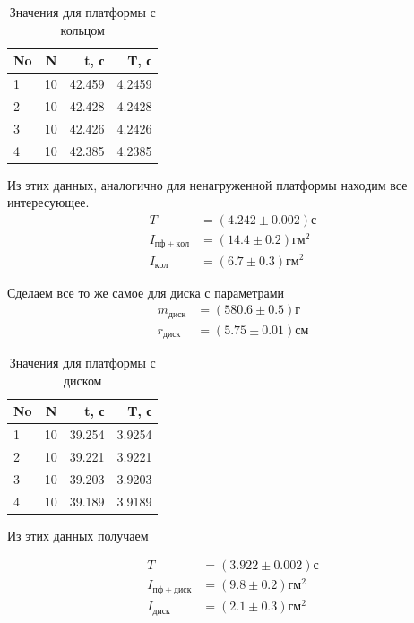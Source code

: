 \documentclass[a4paper, 12pt]{article}
\begin{document}
    \begin{table}[h!]
    \begin{center}
    \begin{tabular}{|l|r|r|r|}
    \hline
    No &   N &       t, с &         T, с \\
    \hline
    1  &  10 &  42.459 &  4.2459 \\
    2  &  10 &  42.428 &  4.2428 \\
    3  &  10 &  42.426 &  4.2426 \\
    4  &  10 &  42.385 &  4.2385 \\
    \hline
    \end{tabular}
    \end{center}
    \caption{Значения для платформы с кольцом}

    \end{table}
    Из этих данных, аналогично для ненагруженной платформы находим все интересующее.
    \begin{align*}
    T &= (4.242 \pm 0.002)с \\
    I_{пф+кол}&=(14.4 \pm 0.2)гм^2 \\
    I_{кол}&=(6.7 \pm 0.3)гм^2
    \end{align*}


    Сделаем все то же самое для диска с параметрами
    \begin{align*}
    m_{диск} &= (580.6 \pm 0.5) г \\
    r_{диск} &= (5.75 \pm 0.01) см
    \end{align*}

    \begin{table}[h!]
    \begin{center}
    \begin{tabular}{|l|r|r|r|}
    \hline
    No &   N &       t, с &         T, с \\
    \hline
    1  &  10 &  39.254 &  3.9254 \\
    2  &  10 &  39.221 &  3.9221 \\
    3  &  10 &  39.203 &  3.9203 \\
    4  &  10 &  39.189 &  3.9189 \\
    \hline
    \end{tabular}
    \end{center}
    \caption{Значения для платформы с диском}

    \end{table}
    Из этих данных получаем


    \begin{align*}
    T &= (3.922 \pm 0.002)с \\
    I_{пф+диск}&=(9.8 \pm 0.2)гм^2 \\
    I_{диск}&=(2.1 \pm 0.3)гм^2
    \end{align*}
\end{document}
